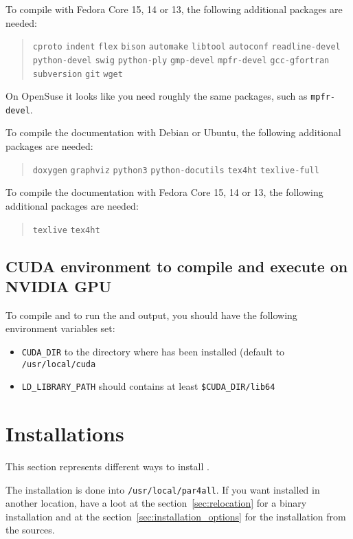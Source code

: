 \documentclass[a4paper]{article}
\begin{document}
To compile \Apfa with Fedora Core 15, 14 or 13, the following additional
packages are needed:
\begin{quote}
  \texttt{cproto} \texttt{indent} \texttt{flex} \texttt{bison}
  \texttt{automake} \texttt{libtool} \texttt{autoconf}
  \texttt{readline-devel} \texttt{python-devel} \texttt{swig}
  \texttt{python-ply} \texttt{gmp-devel}
  \texttt{mpfr-devel} \texttt{gcc-gfortran} \texttt{subversion}
  \texttt{git} \texttt{wget}
\end{quote}
On OpenSuse it looks like you need roughly the same packages, such as
\texttt{mpfr-devel}.

To compile the documentation with Debian or Ubuntu, the following
additional packages are needed:
\begin{quote}
  \texttt{doxygen} \texttt{graphviz} \texttt{python3}
  \texttt{python-docutils} \texttt{tex4ht} \texttt{texlive-full}
\end{quote}

To compile the documentation with Fedora Core 15, 14 or 13, the following
additional packages are needed:
\begin{quote}
  \texttt{texlive} \texttt{tex4ht}
\end{quote}


\subsection{CUDA environment to compile and execute on NVIDIA GPU}

To compile and to run the \Acuda and \Aopencl output, you should have the following
environment variables set:
\begin{itemize}
\item \verb|CUDA_DIR| to the directory where \Acuda has been installed (default to
  \texttt{/usr/local/cuda}
\item \verb|LD_LIBRARY_PATH| should contains at least \verb|$CUDA_DIR/lib64|
\end{itemize}


\section{Installations}
\label{sec:installation}

This section represents different ways to install \Apfa.

The installation is done into \texttt{/usr/local/par4all}. If you want
\Apfa installed in another location, have a loot at the
section~\ref{sec:relocation} for a binary installation and at the
section~\ref{sec:installation_options} for the installation from the
sources.
\end{document}
